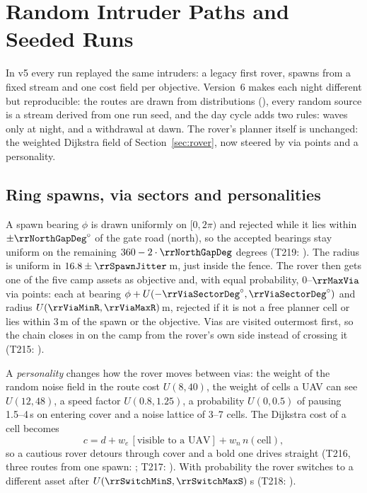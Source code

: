 \section{Random Intruder Paths and Seeded Runs}\label{sec:randompaths}
In v5 every run replayed the same intruders: a legacy first rover, spawns from a fixed stream and one cost field per objective. Version~6 makes each night different but reproducible: the routes are drawn from distributions (), every random source is a stream derived from one run seed, and the day cycle adds two rules: waves only at night, and a withdrawal at dawn. The rover's planner itself is unchanged: the weighted Dijkstra field of Section~\ref{sec:rover}, now steered by via points and a personality.

\subsection{Ring spawns, via sectors and personalities}
A spawn bearing $\phi$ is drawn uniformly on $[0,2\pi)$ and rejected while it lies within $\pm\rrNorthGapDeg^\circ$ of the gate road (north), so the accepted bearings stay uniform on the remaining $360-2\cdot\rrNorthGapDeg$ degrees (T219: ). The radius is uniform in $16.8\pm\rrSpawnJitter$\,m, just inside the fence. The rover then gets one of the five camp assets as objective and, with equal probability, $0$--$\rrMaxVia$ via points: each at bearing $\phi+U(-\rrViaSectorDeg^\circ,\rrViaSectorDeg^\circ)$ and radius $U(\rrViaMinR,\rrViaMaxR)$\,m, rejected if it is not a free planner cell or lies within 3\,m of the spawn or the objective. Vias are visited outermost first, so the chain closes in on the camp from the rover's own side instead of crossing it (T215: ).

A \emph{personality} changes how the rover moves between vias: the weight of the random noise field in the route cost $U(8,40)$, the weight of cells a UAV can see $U(12,48)$, a speed factor $U(0.8,1.25)$, a probability $U(0,0.5)$ of pausing 1.5--4\,s on entering cover and a noise lattice of 3--7 cells. The Dijkstra cost of a cell becomes
\begin{equation}c=d+w_e\,[\text{visible to a UAV}]+w_n\,n(\text{cell}),\end{equation}
so a cautious rover detours through cover and a bold one drives straight (T216, three routes from one spawn: ; T217: ). With probability \rrSwitchProbability{} the rover switches to a different asset after $U(\rrSwitchMinS,\rrSwitchMaxS)$\,s (T218: ).
\begin{table}[h]
\centering\small
\caption{Random-route constants (generated from ).}\label{tab:rrconst}
\tabRandomRoutes
\end{table}
\lstRandomRoute

